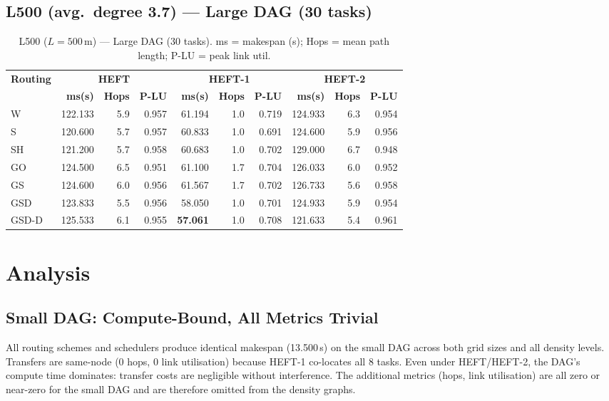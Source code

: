 \documentclass[11pt]{article}
\newcommand{\win}[1]{\textcolor{green!50!black}{\textbf{#1}}}
\newcommand{\bad}[1]{\textcolor{red!70!black}{#1}}
\begin{document}
\subsection{L500 (avg.\ degree 3.7) --- Large DAG (30 tasks)}
\begin{table}[H]
\centering\small
\begin{tabular}{l r r r r r r r r r}
\toprule
\textbf{Routing} & \multicolumn{3}{c}{\textbf{HEFT}} & \multicolumn{3}{c}{\textbf{HEFT-1}} & \multicolumn{3}{c}{\textbf{HEFT-2}} \\
\cmidrule(lr){2-4}\cmidrule(lr){5-7}\cmidrule(lr){8-10}
& \textbf{ms(s)} & \textbf{Hops} & \textbf{P-LU} & \textbf{ms(s)} & \textbf{Hops} & \textbf{P-LU} & \textbf{ms(s)} & \textbf{Hops} & \textbf{P-LU} \\
\midrule
  W & 122.133 & 5.9 & 0.957 & 61.194 & 1.0 & 0.719 & 124.933 & 6.3 & 0.954 \\
  S & 120.600 & 5.7 & 0.957 & 60.833 & 1.0 & 0.691 & 124.600 & 5.9 & 0.956 \\
  SH & 121.200 & 5.7 & 0.958 & 60.683 & 1.0 & 0.702 & \bad{129.000} & 6.7 & 0.948 \\
  GO & 124.500 & 6.5 & 0.951 & 61.100 & 1.7 & 0.704 & 126.033 & 6.0 & 0.952 \\
  GS & 124.600 & 6.0 & 0.956 & \bad{61.567} & 1.7 & 0.702 & 126.733 & 5.6 & 0.958 \\
  GSD & 123.833 & 5.5 & 0.956 & 58.050 & 1.0 & 0.701 & 124.933 & 5.9 & 0.954 \\
  GSD-D & \bad{125.533} & 6.1 & 0.955 & \win{57.061} & 1.0 & 0.708 & 121.633 & 5.4 & 0.961 \\
\bottomrule
\end{tabular}
\caption{L500 ($L=500$\,m) --- Large DAG (30 tasks). ms = makespan (s); Hops = mean path length; P-LU = peak link util.}
\end{table}

\section{Analysis}

\subsection{Small DAG: Compute-Bound, All Metrics Trivial}

All routing schemes and schedulers produce identical makespan (13.500\,s) on the small DAG across both grid sizes and all density levels. Transfers are same-node (0 hops, 0 link utilisation) because HEFT-1 co-locates all 8 tasks. Even under HEFT/HEFT-2, the DAG's compute time dominates: transfer costs are negligible without interference. The additional metrics (hops, link utilisation) are all zero or near-zero for the small DAG and are therefore omitted from the density graphs.
\end{document}
